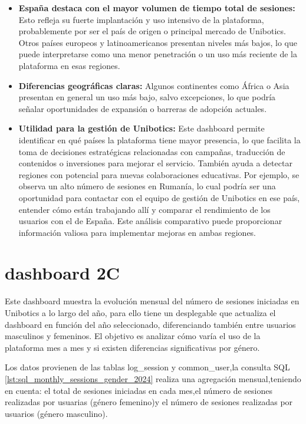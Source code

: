 \documentclass[a4paper, 12pt]{book}
\begin{document}
\begin{itemize}
  \item \textbf{España destaca con el mayor volumen de tiempo total de sesiones:} Esto refleja su fuerte implantación y uso intensivo de la plataforma, probablemente por ser el país de origen o principal mercado de Unibotics. Otros países europeos y latinoamericanos presentan niveles más bajos, lo que puede interpretarse como una menor penetración o un uso más reciente de la plataforma en esas regiones.

  \item \textbf{Diferencias geográficas claras:} Algunos continentes como África o Asia presentan en general un uso más bajo, salvo excepciones, lo que podría señalar oportunidades de expansión o barreras de adopción actuales.

  \item \textbf{Utilidad para la gestión de Unibotics:} Este dashboard permite identificar en qué países la plataforma tiene mayor presencia, lo que facilita la toma de decisiones estratégicas relacionadas con campañas, traducción de contenidos o inversiones para mejorar el servicio. También ayuda a detectar regiones con potencial para nuevas colaboraciones educativas. Por ejemplo, se observa un alto número de sesiones en Rumanía, lo cual podría ser una oportunidad para contactar con el equipo de gestión de Unibotics en ese país, entender cómo están trabajando allí y comparar el rendimiento de los usuarios con el de España. Este análisis comparativo puede proporcionar información valiosa para implementar mejoras en ambas regiones.
  
\end{itemize}


\section{dashboard 2C}

Este dashboard muestra la evolución mensual del número de sesiones iniciadas en Unibotics a lo largo del año, para ello tiene un desplegable que actualiza el dashboard en función del año seleccionado, diferenciando también entre usuarios masculinos y femeninos. El objetivo es analizar cómo varía el uso de la plataforma mes a mes y si existen diferencias significativas por género.

Los datos provienen de las tablas log\_session y common\_user,la consulta SQL \ref{lst:sql_monthly_sessions_gender_2024} realiza una agregación mensual,teniendo en cuenta: el total de sesiones iniciadas en cada mes,el número de sesiones realizadas por usuarias (género femenino)y el número de sesiones realizadas por usuarios (género masculino).
\end{document}
